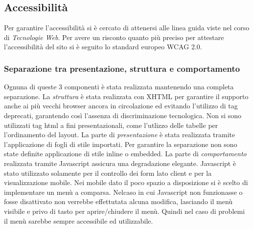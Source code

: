 \subsection{Accessibilità}
Per garantire l'accessibilità si è cercato di attenersi alle linea guida viste nel corso di \textit{Tecnologie Web}. Per avere un risconto quanto più preciso per attestare l'accessibilità del sito si è seguito lo standard europeo WCAG 2.0.
\subsubsection{Separazione tra presentazione, struttura e comportamento}
Ognuna di queste 3 componenti è stata realizzata mantenendo una completa separazione. 
La \textit{struttura} è stata realizzata con XHTML per garantire il supporto anche ai più vecchi browser ancora in circolazione ed evitando l'utilizzo di tag deprecati, garantendo così l'assenza di discriminazione tecnologica.
Non si sono utilizzati tag html a fini presentazionali, come l'utlizzo delle tabelle per l'ordinamento del layout.
La parte di \textit{presentazione} è stata realizzata tramite l'applicazione di fogli di stile importati. Per garantire la separazione non sono state definite applicazione di stile inline o embedded.
La parte di \textit{comportamento} realizzata tramite Javascript assicura una degradazione elegante. Javascript è stato utilizzato solamente per il controllo dei form lato client e per la visualizzazione mobile. Nei mobile dato il poco spazio a disposizione si è scelto di implementare un menù a comparsa. Nelcaso in cui Javascript non funzionasse o fosse disattivato non verrebbe effettutata alcuna modifica, lasciando il menù visibile e privo di tasto per aprire/chiudere il menù. Quindi nel caso di problemi il menù sarebbe sempre accessibile ed utilizzabile.
